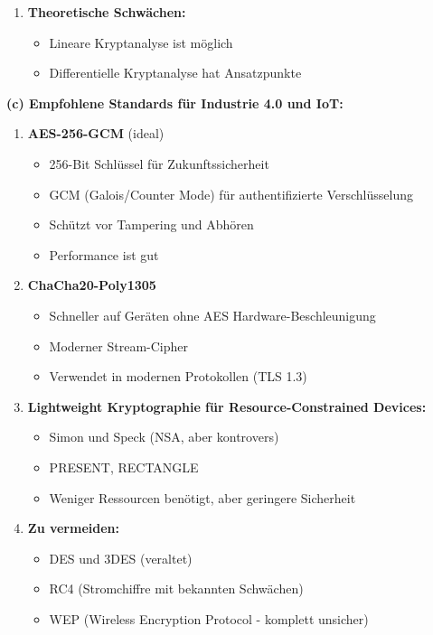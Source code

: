 \documentclass[12pt,a4paper]{article}
\begin{document}
\begin{tcolorbox}[colback=solutionbg, colframe=black!30]
\begin{enumerate}[1.]
    \item \textbf{Theoretische Schwächen:}
    \begin{itemize}
        \item Lineare Kryptanalyse ist möglich
        \item Differentielle Kryptanalyse hat Ansatzpunkte
    \end{itemize}
\end{enumerate}

\end{tcolorbox}
\begin{tcolorbox}[colback=solutionbg, colframe=black!30]

\textbf{(c) Empfohlene Standards für Industrie 4.0 und IoT:} \checkmark
    
\begin{enumerate}[\textbf{1.}]
    \item \textbf{AES-256-GCM} (ideal)
    \begin{itemize}
        \item 256-Bit Schlüssel für Zukunftssicherheit
        \item GCM (Galois/Counter Mode) für authentifizierte Verschlüsselung
        \item Schützt vor Tampering und Abhören
        \item Performance ist gut
    \end{itemize}
    
    \item \textbf{ChaCha20-Poly1305}
    \begin{itemize}
        \item Schneller auf Geräten ohne AES Hardware-Beschleunigung
        \item Moderner Stream-Cipher
        \item Verwendet in modernen Protokollen (TLS 1.3)
    \end{itemize}
    
    \item \textbf{Lightweight Kryptographie für Resource-Constrained Devices:}
    \begin{itemize}
        \item Simon und Speck (NSA, aber kontrovers)
        \item PRESENT, RECTANGLE
        \item Weniger Ressourcen benötigt, aber geringere Sicherheit
    \end{itemize}
    
    \item \textbf{Zu vermeiden:}
    \begin{itemize}
        \item DES und 3DES (veraltet)
        \item RC4 (Stromchiffre mit bekannten Schwächen)
        \item WEP (Wireless Encryption Protocol - komplett unsicher)
    \end{itemize}
\end{enumerate}

\end{tcolorbox}
\end{document}
